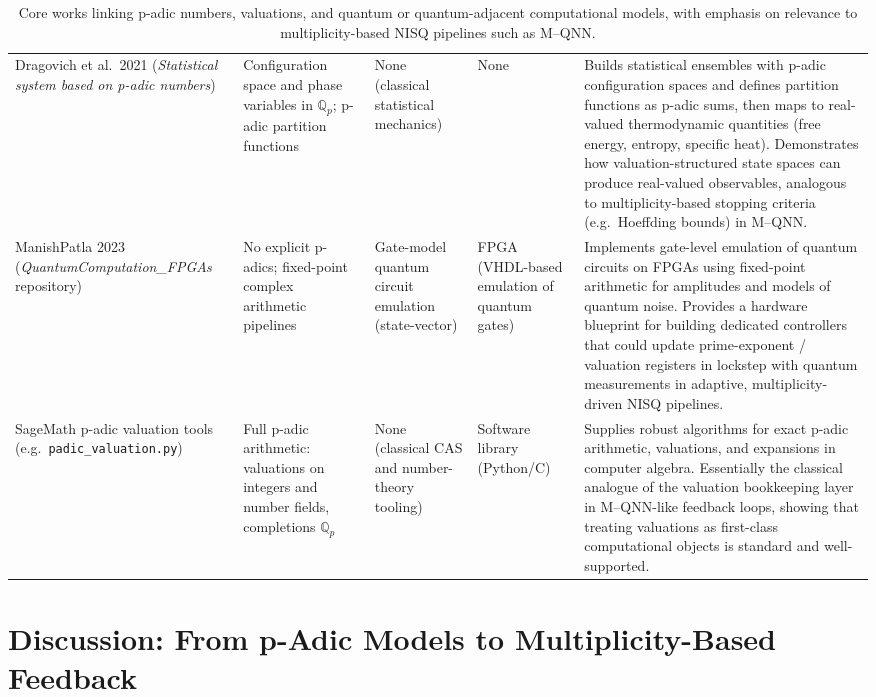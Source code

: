 \documentclass[11pt]{article}
\begin{document}
\begin{table}[h]
\begin{tabularx}{\textwidth}{@{}p{2.3cm}p{2.2cm}p{2.2cm}p{1.8cm}X@{}}
Dragovich et al.~2021
(\emph{Statistical system based on p-adic numbers})
&
Configuration space and phase variables in \(\mathbb{Q}_p\);
p-adic partition functions
&
None (classical statistical mechanics)
&
None
&
Builds statistical ensembles with p-adic configuration spaces and
defines partition functions as p-adic sums, then maps to real-valued
thermodynamic quantities (free energy, entropy, specific heat).
Demonstrates how valuation-structured state spaces can produce
real-valued observables, analogous to multiplicity-based stopping
criteria (e.g.\ Hoeffding bounds) in M--QNN. \\

ManishPatla 2023
(\emph{QuantumComputation\_FPGAs} repository)
&
No explicit p-adics; fixed-point complex arithmetic pipelines
&
Gate-model quantum circuit emulation (state-vector)
&
FPGA (VHDL-based emulation of quantum gates)
&
Implements gate-level emulation of quantum circuits on FPGAs using
fixed-point arithmetic for amplitudes and models of quantum noise.
Provides a hardware blueprint for building dedicated controllers that
could update prime-exponent / valuation registers in lockstep with
quantum measurements in adaptive, multiplicity-driven NISQ pipelines. \\

SageMath p-adic valuation tools
(e.g.\ \texttt{padic\_valuation.py})
&
Full p-adic arithmetic: valuations on integers and number fields,
completions \(\mathbb{Q}_p\)
&
None (classical CAS and number-theory tooling)
&
Software library (Python/C)
&
Supplies robust algorithms for exact p-adic arithmetic, valuations,
and expansions in computer algebra.
Essentially the classical analogue of the valuation bookkeeping layer
in M--QNN-like feedback loops, showing that treating valuations as
first-class computational objects is standard and well-supported. \\

\bottomrule
\end{tabularx}
\caption{Core works linking p-adic numbers, valuations, and quantum or
quantum-adjacent computational models, with emphasis on relevance to
multiplicity-based NISQ pipelines such as M--QNN.}
\label{tab:core}
\end{table}

\section{Discussion: From p-Adic Models to Multiplicity-Based Feedback}
\end{document}
